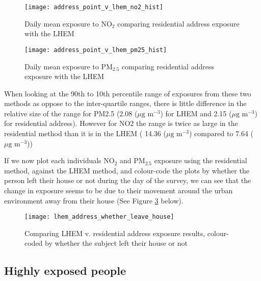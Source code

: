 \begin{figure}[H]
\centering
\texttt{[image: address\_point\_v\_lhem\_no2\_hist]}
\caption{Daily mean exposure to NO$_{2}$ comparing residential address exposure with the LHEM}
\label{fig:address_point_v_lhem_no2_hist}
\end{figure}

\begin{figure}[H]
\centering
\texttt{[image: address\_point\_v\_lhem\_pm25\_hist]}
\caption{Daily mean exposure to PM$_{2.5}$ comparing residential address exposure with the LHEM}
\label{fig:address_point_v_lhem_pm25_hist}
\end{figure}

When looking at the 90th to 10th percentile range of exposures from these two methods as oppose to the 
inter-quartile ranges, there is little difference in the relative size of the range for PM2.5 (2.08 ($\mu \text{g m}^{-3}$) for LHEM and 2.15 ($\mu \text{g m}^{-3}$) for residential address). However for NO2 the range is twice as large in the residential method than it is in the LHEM ( 14.36 ($\mu \text{g m}^{-3}$) compared to 7.64 ($\mu \text{g m}^{-3}$))

If we now plot each individuals NO$_{2}$ and PM$_{2.5}$ exposure using the residential method, against the LHEM method, and colour-code the plots by whether the person left their house or not during the day of the survey, we can see that the change in exposure seems to be due to their movement around the urban environment away from their house (See Figure \ref{fig:lhem_address_whether_leave_house} below).

\begin{figure}[H]
\centering
\texttt{[image: lhem\_address\_whether\_leave\_house]}
\caption{Comparing LHEM v. residential address exposure results, colour-coded by whether the subject left their house or not}
\label{fig:lhem_address_whether_leave_house}
\end{figure}

\subsection{Highly exposed people}
\label{subsec:highly_exposed_people}

